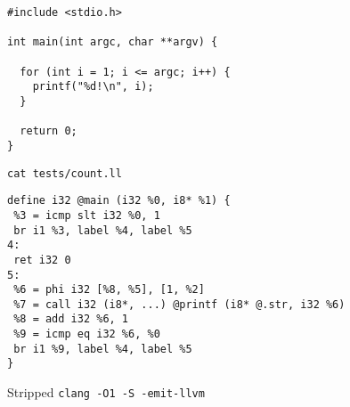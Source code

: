 \documentclass{article}
\begin{document}
\begin{figure}[H]
  \begin{minipage}[b]{0.48\textwidth}
     \centering
     \begin{verbatim}
#include <stdio.h>

int main(int argc, char **argv) {

  for (int i = 1; i <= argc; i++) {
    printf("%d!\n", i);
  }

  return 0;
}
     \end{verbatim}
     \caption{\texttt{cat tests/count.ll}}\label{fig:countc}
   \end{minipage}\hfill
   \begin{minipage}[b]{0.48\textwidth}
     \centering
     \begin{verbatim}
define i32 @main (i32 %0, i8* %1) {
 %3 = icmp slt i32 %0, 1
 br i1 %3, label %4, label %5
4:
 ret i32 0
5:
 %6 = phi i32 [%8, %5], [1, %2]
 %7 = call i32 (i8*, ...) @printf (i8* @.str, i32 %6)
 %8 = add i32 %6, 1
 %9 = icmp eq i32 %6, %0
 br i1 %9, label %4, label %5
}
     \end{verbatim}
     \caption{Stripped \texttt{clang -O1 -S -emit-llvm}}\label{fig:count1ll}
   \end{minipage}
\end{figure}



\end{document}

